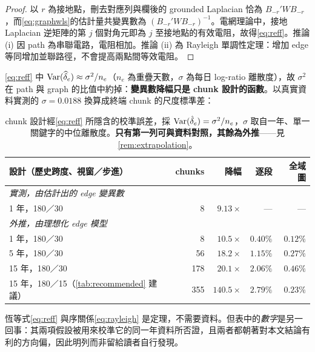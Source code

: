 \documentclass[12pt,a4paper,oneside]{article}
\begin{document}
\begin{proof}
以 $r$ 為接地點，刪去對應列與欄後的 grounded Laplacian 恰為 $B_{-r}'WB_{-r}$，而\cref{eq:graphwls}的估計量共變異數為 $(B_{-r}'WB_{-r})^{-1}$。電網理論中，接地 Laplacian 逆矩陣的第 $j$ 個對角元即為 $j$ 至接地點的有效電阻，故得\cref{eq:reff}。推論 (i) 因 path 為串聯電路，電阻相加。推論 (ii) 為 Rayleigh 單調性定理：增加 edge 等同增加並聯路徑，不會提高兩點間等效電阻。
\end{proof}

\begin{remark}[這使 F1 成為可在設計階段計算的量]
\label{rem:designtool}
\cref{eq:reff} 中 $\operatorname{Var}(\widehat\delta_e)\approx\sigma^2/n_e$（$n_e$ 為重疊天數，$\sigma$ 為每日 log-ratio 離散度），故 $\sigma^2$ 在 path 與 graph 的比值中約掉：\textbf{變異數降幅只是 chunk 設計的函數}。以真實資料實測的 $\sigma=0.0188$ 換算成終端 chunk 的尺度標準差：

\begin{table}[H]
\centering
\small
\caption{chunk 設計經\cref{eq:reff} 所隱含的校準誤差，採 $\operatorname{Var}(\hat\delta_e)=\sigma^2/n_e$，$\sigma$ 取自一年、單一關鍵字的中位離散度。\textbf{只有第一列可與資料對照，其餘為外推}——見\cref{rem:extrapolation}。}
\label{tab:designreff}
\begin{tabular}{lrrrr}
\toprule
設計（歷史跨度、視窗／步進） & chunks & 降幅 & 逐段 & 全域圖\\
\midrule
\multicolumn{5}{l}{\emph{實測，由估計出的 edge 變異數}}\\
1 年，180／30 & 8 & $\mathbf{9.13\times}$ & --- & ---\\
\midrule
\multicolumn{5}{l}{\emph{外推，由理想化 edge 模型}}\\
1 年，180／30 & 8 & $10.5\times$ & $0.40\%$ & $0.12\%$\\
5 年，180／30 & 56 & $18.2\times$ & $1.15\%$ & $0.27\%$\\
15 年，180／30 & 178 & $20.1\times$ & $2.06\%$ & $0.46\%$\\
15 年，180／15（\cref{tab:recommended} 建議） & 355 & $140.5\times$ & $2.79\%$ & $0.23\%$\\
\bottomrule
\end{tabular}
\end{table}

\begin{remark}
\label{rem:extrapolation}
恆等式\cref{eq:reff} 與序關係\cref{eq:rayleigh} 是定理，不需要資料。但表中的\emph{數字}是另一回事：其兩項假設被用來校準它的同一年資料所否證，且兩者都朝著對本文結論有利的方向偏，因此明列而非留給讀者自行發現。


\end{remark}
\end{remark}
\end{document}
